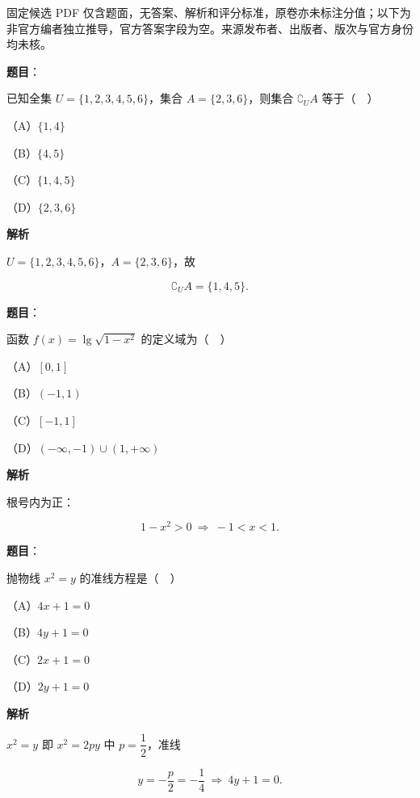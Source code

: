 

\begin{gktip}
固定候选 PDF 仅含题面，无答案、解析和评分标准，原卷亦未标注分值；以下为非官方编者独立推导，官方答案字段为空。来源发布者、出版者、版次与官方身份均未核。
\end{gktip}

\begin{answer}

\textbf{题目}：

已知全集 $U=\{1,2,3,4,5,6\}$，集合 $A=\{2,3,6\}$，则集合 $\complement_UA$ 等于（　）

（A）$\{1,4\}$

（B）$\{4,5\}$

（C）$\{1,4,5\}$

（D）$\{2,3,6\}$

\textbf{解析}

$U=\{1,2,3,4,5,6\}$，$A=\{2,3,6\}$，故

\nopagebreak[4]
\[\complement_UA=\{1,4,5\}.\]


\end{answer}
\begin{answer}

\textbf{题目}：

函数 $f(x)=\lg\sqrt{1-x^2}$ 的定义域为（　）

（A）$[0,1]$

（B）$(-1,1)$

（C）$[-1,1]$

（D）$(-\infty,-1)\cup(1,+\infty)$

\textbf{解析}

根号内为正：

\nopagebreak[4]
\[1-x^2>0\ \Rightarrow\ -1<x<1.\]


\end{answer}
\begin{answer}

\textbf{题目}：

抛物线 $x^2=y$ 的准线方程是（　）

（A）$4x+1=0$

（B）$4y+1=0$

（C）$2x+1=0$

（D）$2y+1=0$

\textbf{解析}

$x^2=y$ 即 $x^2=2py$ 中 $p=\dfrac12$，准线

\nopagebreak[4]
\[y=-\frac p2=-\frac14\ \Rightarrow\ 4y+1=0.\]


\end{answer}
